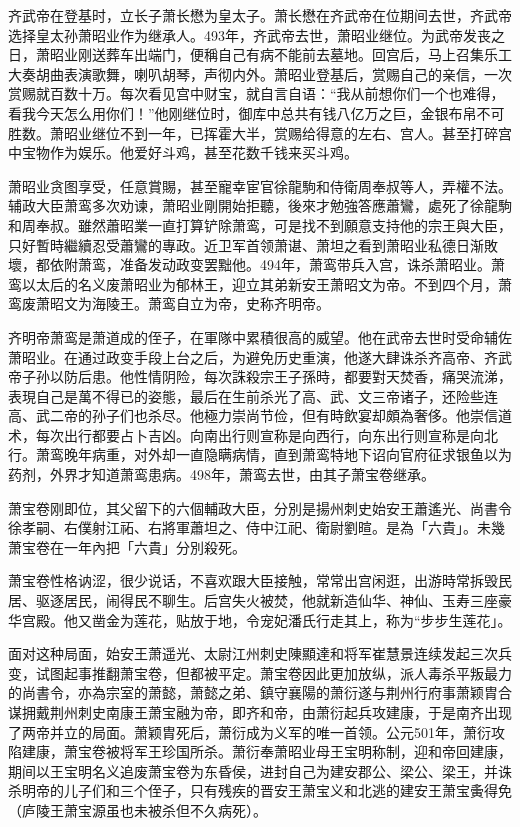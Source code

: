 齐武帝在登基时，立长子萧长懋为皇太子。萧长懋在齐武帝在位期间去世，齐武帝选择皇太孙萧昭业作为继承人。493年，齐武帝去世，萧昭业继位。为武帝发丧之日，萧昭业刚送葬车出端门，便稱自己有病不能前去墓地。回宫后，马上召集乐工大奏胡曲表演歌舞，喇叭胡琴，声彻内外。萧昭业登基后，赏赐自己的亲信，一次赏赐就百数十万。每次看见宫中财宝，就自言自语：“我从前想你们一个也难得，看我今天怎么用你们！”他刚继位时，御库中总共有钱八亿万之巨，金银布帛不可胜数。萧昭业继位不到一年，已挥霍大半，赏赐给得意的左右、宫人。甚至打碎宫中宝物作为娱乐。他爱好斗鸡，甚至花数千钱来买斗鸡。

萧昭业贪图享受，任意賞賜，甚至寵幸宦官徐龍駒和侍衛周奉叔等人，弄權不法。辅政大臣萧鸾多次劝谏，萧昭业剛開始拒聽，後來才勉強答應蕭鸞，處死了徐龍駒和周奉叔。雖然蕭昭業一直打算铲除萧鸾，可是找不到願意支持他的宗王與大臣，只好暫時繼續忍受蕭鸞的專政。近卫军首领萧谌、萧坦之看到萧昭业私德日渐敗壞，都依附萧鸾，准备发动政变罢黜他。494年，萧鸾带兵入宫，诛杀萧昭业。萧鸾以太后的名义废萧昭业为郁林王，迎立其弟新安王萧昭文为帝。不到四个月，萧鸾废萧昭文为海陵王。萧鸾自立为帝，史称齐明帝。

齐明帝萧鸾是萧道成的侄子，在軍隊中累積很高的威望。他在武帝去世时受命辅佐萧昭业。在通过政变手段上台之后，为避免历史重演，他遂大肆诛杀齐高帝、齐武帝子孙以防后患。他性情阴险，每次誅殺宗王子孫時，都要對天焚香，痛哭流涕，表現自己是萬不得已的姿態，最后在生前杀光了高、武、文三帝诸子，还险些连高、武二帝的孙子们也杀尽。他極力崇尚节俭，但有時飲宴却頗為奢侈。他崇信道术，每次出行都要占卜吉凶。向南出行则宣称是向西行，向东出行则宣称是向北行。萧鸾晚年病重，对外却一直隐瞒病情，直到萧鸾特地下诏向官府征求银鱼以为药剂，外界才知道萧鸾患病。498年，萧鸾去世，由其子萧宝卷继承。

萧宝卷刚即位，其父留下的六個輔政大臣，分別是揚州刺史始安王蕭遙光、尚書令徐孝嗣、右僕射江祏、右將軍蕭坦之、侍中江祀、衛尉劉暄。是為「六貴」。未幾萧宝卷在一年內把「六貴」分別殺死。

萧宝卷性格讷涩，很少说话，不喜欢跟大臣接触，常常出宫闲逛，出游時常拆毁民居、驱逐居民，闹得民不聊生。后宫失火被焚，他就新造仙华、神仙、玉寿三座豪华宫殿。他又凿金为莲花，贴放于地，令宠妃潘氏行走其上，称为“步步生莲花」。

面对这种局面，始安王萧遥光、太尉江州刺史陳顯達和将军崔慧景连续发起三次兵变，试图起事推翻萧宝卷，但都被平定。萧宝卷因此更加放纵，派人毒杀平叛最力的尚書令，亦為宗室的萧懿，萧懿之弟、鎮守襄陽的萧衍遂与荆州行府事萧颖胄合谋拥戴荆州刺史南康王萧宝融为帝，即齐和帝，由萧衍起兵攻建康，于是南齐出现了两帝并立的局面。萧颖胄死后，萧衍成为义军的唯一首领。公元501年，萧衍攻陷建康，萧宝卷被将军王珍国所杀。萧衍奉萧昭业母王宝明称制，迎和帝回建康，期间以王宝明名义追废萧宝卷为东昏侯，进封自己为建安郡公、梁公、梁王，并诛杀明帝的儿子们和三个侄子，只有残疾的晋安王萧宝义和北逃的建安王萧宝夤得免（庐陵王萧宝源虽也未被杀但不久病死）。

